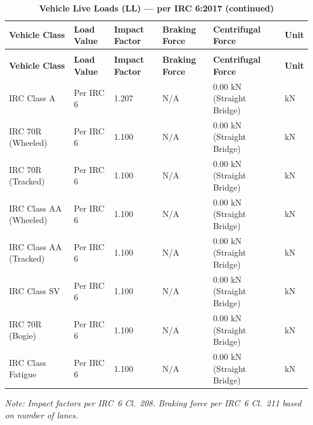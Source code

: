 \documentclass[12pt,a4paper]{report}
\numberwithin{table}{chapter}
\numberwithin{figure}{chapter}
\begin{document}
\vspace{1em}
\begin{longtable}{|L{3.5cm}|C{2.0cm}|C{2.5cm}|C{2.5cm}|C{2.8cm}|C{1.3cm}|}
\caption{\textbf{Vehicle Live Loads (LL) --- per IRC 6:2017}}\\
\hline
\textbf{Vehicle Class} & \textbf{Load Value} & \textbf{Impact Factor} & \textbf{Braking Force} & \textbf{Centrifugal Force} & \textbf{Unit} \\[6pt]
\hline
\endfirsthead
\caption[]{\textbf{Vehicle Live Loads (LL) --- per IRC 6:2017 (continued)}}\\
\hline
\textbf{Vehicle Class} & \textbf{Load Value} & \textbf{Impact Factor} & \textbf{Braking Force} & \textbf{Centrifugal Force} & \textbf{Unit} \\[6pt]
\hline
\endhead
\hline
\endfoot
\endlastfoot
IRC Class A & Per IRC 6 & 1.207 & N/A & 0.00 kN (Straight Bridge) & kN \\[6pt]
\hline
IRC 70R (Wheeled) & Per IRC 6 & 1.100 & N/A & 0.00 kN (Straight Bridge) & kN \\[6pt]
\hline
IRC 70R (Tracked) & Per IRC 6 & 1.100 & N/A & 0.00 kN (Straight Bridge) & kN \\[6pt]
\hline
IRC Class AA (Wheeled) & Per IRC 6 & 1.100 & N/A & 0.00 kN (Straight Bridge) & kN \\[6pt]
\hline
IRC Class AA (Tracked) & Per IRC 6 & 1.100 & N/A & 0.00 kN (Straight Bridge) & kN \\[6pt]
\hline
IRC Class SV & Per IRC 6 & 1.100 & N/A & 0.00 kN (Straight Bridge) & kN \\[6pt]
\hline
IRC 70R (Bogie) & Per IRC 6 & 1.100 & N/A & 0.00 kN (Straight Bridge) & kN \\[6pt]
\hline
IRC Class Fatigue & Per IRC 6 & 1.100 & N/A & 0.00 kN (Straight Bridge) & kN \\[6pt]
\hline
\end{longtable}
\noindent\textit{Note: Impact factors per IRC~6 Cl.~208. Braking force per IRC~6 Cl.~211 based on number of lanes.}
\end{document}
